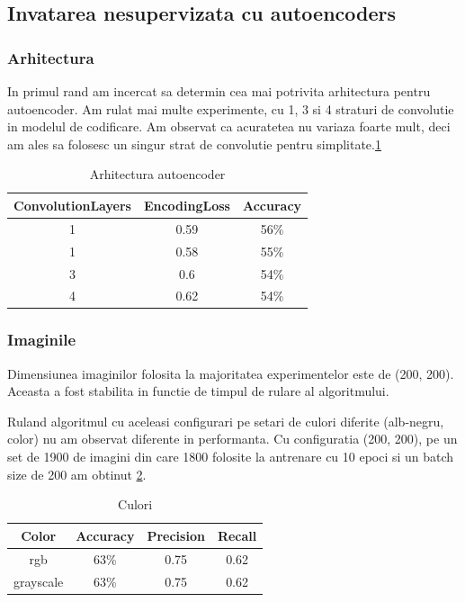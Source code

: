 \documentclass{article}
\begin{document}
\subsection{Invatarea nesupervizata cu autoencoders}

\subsubsection{Arhitectura}
In primul rand am incercat sa determin cea mai potrivita arhitectura pentru autoencoder. Am rulat mai multe experimente, cu 1, 3 si 4 straturi de convolutie in modelul de codificare. Am observat ca acuratetea nu variaza foarte mult, deci am ales sa folosesc un singur strat de convolutie pentru simplitate.\ref{tab:arh}

\begin{table}[h!]
  \begin{center}
    \caption{Arhitectura autoencoder}
    \label{tab:arh}
    \begin{tabular}{c|c|c}
      \textbf{ConvolutionLayers} & \textbf{EncodingLoss} & \textbf{Accuracy}\\
      \hline
      1 & 0.59 & 56\% \\
      1 & 0.58 & 55\% \\
      3 & 0.6 & 54\%  \\
      4 & 0.62 & 54\% \\
      \end{tabular}
  \end{center}
\end{table}

\subsubsection{Imaginile}
Dimensiunea imaginilor folosita la majoritatea experimentelor este de (200, 200). Aceasta a fost stabilita in functie de timpul de rulare al algoritmului. 

Ruland algoritmul cu aceleasi configurari pe setari de culori diferite (alb-negru, color) nu am observat diferente in performanta.
Cu configuratia (200, 200), pe un set de 1900 de imagini din care 1800 folosite la antrenare cu 10 epoci si un batch size de 200 am obtinut \ref{tab:resColor}.
\begin{table}[h!]
 
  \begin{center}
    \caption{Culori}
    \label{tab:resColor}
    \begin{tabular}{c|c|c|c}
      \textbf{Color} & \textbf{Accuracy} & \textbf{Precision} & \textbf{Recall} \\
      \hline
      rgb & 63\% & 0.75  & 0.62 \\
      grayscale & 63\% & 0.75 & 0.62 \\
      \end{tabular}
  \end{center}
\end{table}
\end{document}
